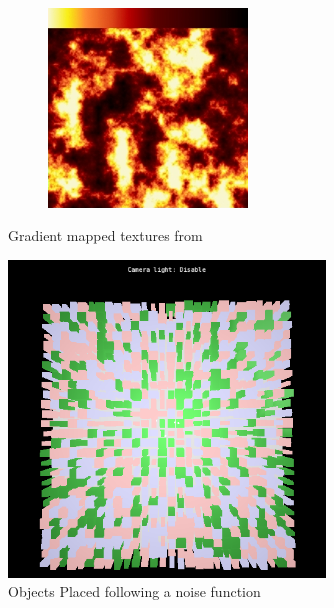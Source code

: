 \begin{figure}
\begin{subfigure}[b]{0.3\textwidth}
                \label{fig:Nblackandwhite}
        \end{subfigure}
        ~ %
        \begin{subfigure}[b]{0.3\textwidth}
                \includegraphics[width=\textwidth]{img/Theory/Perlin_Noise/gradient_fire.png}
                \label{fig:Nredblack}
        \end{subfigure}
        \caption{Gradient mapped textures from \cite{NoisesGAMES}}
        \label{fig:NTextures}
\end{figure}

\begin{figure}[htbp]
    \centering
    \includegraphics[width=0.75\textwidth]{img/Theory/Perlin_Noise/AppletNoName201501191604.png}
    \caption{Objects Placed following a noise function}
    \label{fig:MyNCity}
\end{figure}

